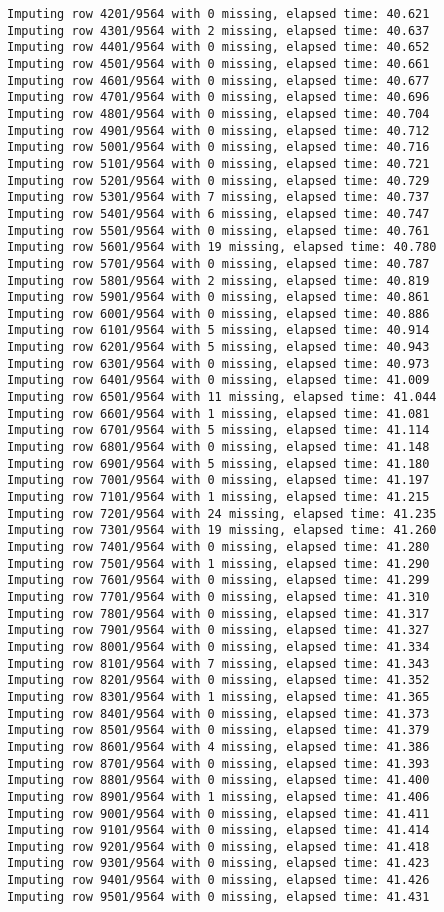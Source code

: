 \documentclass[11pt]{article}
\begin{document}
\begin{Verbatim}[commandchars=\\\{\}]
Imputing row 4201/9564 with 0 missing, elapsed time: 40.621
Imputing row 4301/9564 with 2 missing, elapsed time: 40.637
Imputing row 4401/9564 with 0 missing, elapsed time: 40.652
Imputing row 4501/9564 with 0 missing, elapsed time: 40.661
Imputing row 4601/9564 with 0 missing, elapsed time: 40.677
Imputing row 4701/9564 with 0 missing, elapsed time: 40.696
Imputing row 4801/9564 with 0 missing, elapsed time: 40.704
Imputing row 4901/9564 with 0 missing, elapsed time: 40.712
Imputing row 5001/9564 with 0 missing, elapsed time: 40.716
Imputing row 5101/9564 with 0 missing, elapsed time: 40.721
Imputing row 5201/9564 with 0 missing, elapsed time: 40.729
Imputing row 5301/9564 with 7 missing, elapsed time: 40.737
Imputing row 5401/9564 with 6 missing, elapsed time: 40.747
Imputing row 5501/9564 with 0 missing, elapsed time: 40.761
Imputing row 5601/9564 with 19 missing, elapsed time: 40.780
Imputing row 5701/9564 with 0 missing, elapsed time: 40.787
Imputing row 5801/9564 with 2 missing, elapsed time: 40.819
Imputing row 5901/9564 with 0 missing, elapsed time: 40.861
Imputing row 6001/9564 with 0 missing, elapsed time: 40.886
Imputing row 6101/9564 with 5 missing, elapsed time: 40.914
Imputing row 6201/9564 with 5 missing, elapsed time: 40.943
Imputing row 6301/9564 with 0 missing, elapsed time: 40.973
Imputing row 6401/9564 with 0 missing, elapsed time: 41.009
Imputing row 6501/9564 with 11 missing, elapsed time: 41.044
Imputing row 6601/9564 with 1 missing, elapsed time: 41.081
Imputing row 6701/9564 with 5 missing, elapsed time: 41.114
Imputing row 6801/9564 with 0 missing, elapsed time: 41.148
Imputing row 6901/9564 with 5 missing, elapsed time: 41.180
Imputing row 7001/9564 with 0 missing, elapsed time: 41.197
Imputing row 7101/9564 with 1 missing, elapsed time: 41.215
Imputing row 7201/9564 with 24 missing, elapsed time: 41.235
Imputing row 7301/9564 with 19 missing, elapsed time: 41.260
Imputing row 7401/9564 with 0 missing, elapsed time: 41.280
Imputing row 7501/9564 with 1 missing, elapsed time: 41.290
Imputing row 7601/9564 with 0 missing, elapsed time: 41.299
Imputing row 7701/9564 with 0 missing, elapsed time: 41.310
Imputing row 7801/9564 with 0 missing, elapsed time: 41.317
Imputing row 7901/9564 with 0 missing, elapsed time: 41.327
Imputing row 8001/9564 with 0 missing, elapsed time: 41.334
Imputing row 8101/9564 with 7 missing, elapsed time: 41.343
Imputing row 8201/9564 with 0 missing, elapsed time: 41.352
Imputing row 8301/9564 with 1 missing, elapsed time: 41.365
Imputing row 8401/9564 with 0 missing, elapsed time: 41.373
Imputing row 8501/9564 with 0 missing, elapsed time: 41.379
Imputing row 8601/9564 with 4 missing, elapsed time: 41.386
Imputing row 8701/9564 with 0 missing, elapsed time: 41.393
Imputing row 8801/9564 with 0 missing, elapsed time: 41.400
Imputing row 8901/9564 with 1 missing, elapsed time: 41.406
Imputing row 9001/9564 with 0 missing, elapsed time: 41.411
Imputing row 9101/9564 with 0 missing, elapsed time: 41.414
Imputing row 9201/9564 with 0 missing, elapsed time: 41.418
Imputing row 9301/9564 with 0 missing, elapsed time: 41.423
Imputing row 9401/9564 with 0 missing, elapsed time: 41.426
Imputing row 9501/9564 with 0 missing, elapsed time: 41.431


\end{Verbatim}
\end{document}
